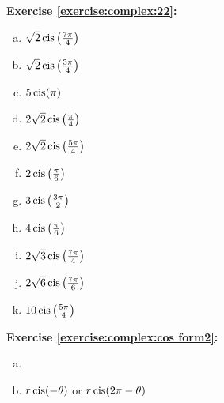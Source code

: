 \noindent\textbf{Exercise \ref{exercise:complex:22}:} %
\begin{multicols}{3}
\begin{enumerate}[(a)]
\item
$\sqrt{2}\operatorname{cis}\left(\frac{7\pi}{4}\right)$

\item
$\sqrt{2}\operatorname{cis}\left(\frac{3\pi}{4}\right)$

\item
$5\operatorname{cis}(\pi)$

\item
$2\sqrt{2}\operatorname{cis}\left(\frac{\pi}{4}\right)$

\item
$2\sqrt{2}\operatorname{cis}\left(\frac{5\pi}{4}\right)$

\item
$2\operatorname{cis}\left(\frac{\pi}{6}\right)$

\item
$3\operatorname{cis}\left(\frac{3\pi}{2}\right)$

\item
$4\operatorname{cis}\left(\frac{\pi}{6}\right)$

\item
$2\sqrt{3}\operatorname{cis}\left(\frac{7\pi}{4}\right)$

\item
$2\sqrt{6}\operatorname{cis}\left(\frac{7\pi}{6}\right)$

\item
$10\operatorname{cis}\left(\frac{5\pi}{4}\right)$
\end{enumerate}
\end{multicols}

\noindent\textbf{Exercise \ref{exercise:complex:cos form2}:}
\begin{enumerate}[(a)]
\item

\item
$r\operatorname{cis}(-\theta)$ or $r\operatorname{cis}(2\pi-\theta)$
\end{enumerate}

